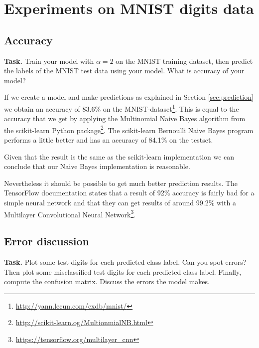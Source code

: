 \documentclass{support/acm_proc_article-sp}
\begin{document}

    \section{Experiments on MNIST digits data}

    \subsection{Accuracy}

    \textbf{Task.} Train your model with $\alpha = 2$ on the MNIST training dataset, then predict the labels of the MNIST test
    data using your model.
    What is accuracy of your model?

    If we create a model and make predictions as explained in Section \ref{sec:prediction} we obtain an accuracy of
    83.6\% on the MNIST-dataset\footnote{\href{http://yann.lecun.com/exdb/mnist/}{http://yann.lecun.com/exdb/mnist/}}.
    This is equal to the accuracy that we get by applying the Multinomial Naive Bayes algorithm from the scikit-learn
    Python package\footnote{\href{http://scikit-learn.org/stable/modules/generated/sklearn.naive_bayes.MultinomialNB.html}{http://scikit-learn.og/MultionmialNB.html}}.
    The scikit-learn Bernoulli Naive Bayes program performs a little better and has an accuracy of 84.1\% on the testset.

    Given that the result is the same as the scikit-learn implementation we can conclude that our Naive Bayes implementation
    is reasonable.

    Nevertheless it should be possible to get much better prediction results.
    The TensorFlow documentation states that a result of 92\% accuracy is fairly bad for a simple neural network and
    that they can get results of around 99.2\% with a Multilayer Convolutional Neural
    Network\footnote{\href{https://www.tensorflow.org/get_started/mnist/pros\#build_a_multilayer_convolutional_network}{https://tensorflow.org/multilayer\_cnn}}.

    \subsection{Error discussion}

    \textbf{Task.} Plot some test digits for each predicted class label.
    Can you spot errors?
    Then plot some misclassified test digits for each predicted class label.
    Finally, compute the confusion matrix.
    Discuss the errors the model makes.
\end{document}
